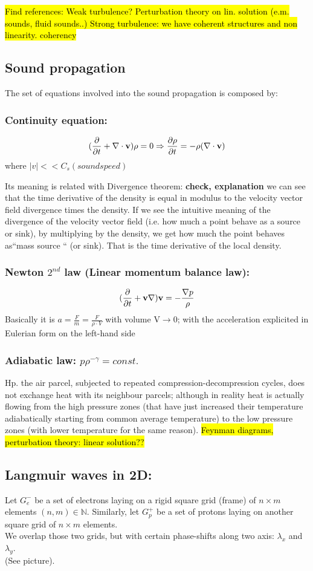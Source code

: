 \documentclass[a4paper,11pt]{article}
\newcommand{\RA}{\Rightarrow}
\newcommand{\dive}{\nabla \cdot}
\newcommand{\cic}[1]{\mathbf{#1}}
\begin{document}
\hl{Find references: Weak turbulence? Perturbation theory on lin. solution (e.m. sounds, fluid sounds..)
Strong turbulence: we have coherent structures and non linearity. coherency}

\subsection{Sound propagation}
The set of equations involved into the sound propagation is composed by:

\subsubsection{Continuity equation:}
\[  (\pdv{}{t}+\dive \cic{v})\rho=0 \RA \pdv{\rho}{t}=- \rho ( \dive \cic{v})     \] where $|v|<<C_s (sound speed)$

Its meaning is related with Divergence theorem: \textbf{check, explanation}
we can see that the time derivative of the density is equal in modulus to the velocity vector field divergence times the density. 
If we see the intuitive meaning of the divergence of the velocity vector field (i.e. how much a point behave as a source or sink), by multiplying by the density, we get how much the point behaves as``mass source `` (or sink). 
That is the time derivative of the local density.
\subsubsection{ Newton $2^{nd}$ law (Linear momentum balance law):}
\[   (\pdv{}{t}+\cic{v}\nabla)\cic{v}=- \frac{\nabla p}{\rho} \]
Basically it is $a=\frac{F}{m}=\frac{F}{\rho \cdot V}$ with volume V$\rightarrow 0$; with the acceleration explicited in Eulerian form on the left-hand side
\subsubsection{Adiabatic law: $p \rho^{-\gamma}=const.$}
Hp. the air parcel, subjected to repeated compression-decompression cycles, does not exchange heat with its neighbour parcels; although in reality heat is actually flowing from the high pressure zones (that have just increased their temperature adiabatically starting from common average temperature) to the low pressure zones (with lower temperature for the same reason).
\hl{Feynman diagrams, perturbation theory: linear solution??}

\subsection{Langmuir waves in 2D:}
Let $G_e^-$ be a set of electrons laying on a rigid square grid (frame) of $n \times m$ elements $(n,m) \in \mathbb{N}$. Similarly, let $G_p^+$ be a set of protons laying on another square grid of  $n \times m$ elements. \\
We overlap those two grids, but with certain phase-shifts along two axis: $\lambda_x$ and $\lambda_y$. \\ (See picture). 
\end{document}
